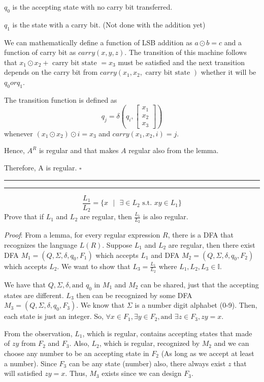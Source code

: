 \documentclass[a4paper, 11pt]{article}
\newcommand{\question}[2] {\vspace{.25in} \hrule\vspace{0.5em}
	\noindent{\bf #1: #2} \vspace{0.5em}
	\hrule \vspace{.10in}}
\begin{document}
	$q_0$ is the accepting state with no carry bit transferred.
	
	$q_1$ is the state with a carry bit. (Not done with the addition yet)
	
	We can mathematically define a function of LSB addition as $a \odot b = c$ and a function of carry bit as $carry(x,y,z)$. The transition of this machine follows that $x_1 \odot x_2 + \text{ carry bit state } = x_3$ must be satisfied and the next transition depends on the carry bit from $carry(x_1, x_2, \text{ carry bit state }) $ whether it will be $q_0or q_1$. 
	
	The transition function is defined as
	\begin{equation*}
	q_j = \delta
	(q_i, \begin{bmatrix}
	x_1 \\
	x_2 \\
	x_3
	\end{bmatrix})
	\end{equation*}
	whenever $(x_1 \odot x_2) \odot i = x_3$ and $carry(x_1,x_2,i) = j$.
	
	Hence, $A^R$ is regular and that makes $A$ regular also from the lemma.
	
	Therefore, A is regular. $\square$
	
	\question{4}{Division Operation?} 
	
	$$\frac{L_1}{L_2} = \{x \text{ $|$ } \exists \in L_2 \text{ s.t. } xy \in L_1 \}$$
	Prove that if $L_1$ and $L_2$ are regular, then $\frac{L_1}{L_2}$ is also regular.
	
	{\em Proof}: 
	From a lemma, for every regular expression $R$, there is a DFA that recognizes the language $L(R)$.
	Suppose $L_1$ and $L_2$ are regular, then there exist DFA $M_1 =(Q,\Sigma,\delta,q_0,F_1)$ which accepts $L_1$ and DFA $M_2 =(Q,\Sigma,\delta,q_0,F_2)$ which accepts $L_2$. We want to show that $L_3 = \frac{L_1}{L_2}$ where $L_1, L_2, L_3 \in \mathbb{I}$.
	
	We have that $Q, \Sigma, \delta, \text{and } q_0$ in $M_1$ and $M_2$ can be shared, just that the accepting states are different. $L_3$ then can be recognized by some DFA $M_3 = (Q,\Sigma,\delta,q_0,F_3)$. We know that $\Sigma$ is a number digit alphabet (0-9). Then, each state is just an integer. So, $\forall x \in F_1, \exists y \in F_2, \text{and } \exists z \in F_3, zy = x$.
	
	From the observation, $L_1$, which is regular, contains accepting states that made of $zy$ from $F_2$ and $F_3$. Also, $L_2$, which is regular, recognized by $M_2$ and we can choose any number to be an accepting state in $F_2$ (As long as we accept at least a number). Since $F_3$ can be any state (number) also, there always exist $z$ that will satisfied $zy = x$. Thus, $M_3$ exists since we can design $F_3$. %
	
\end{document}
